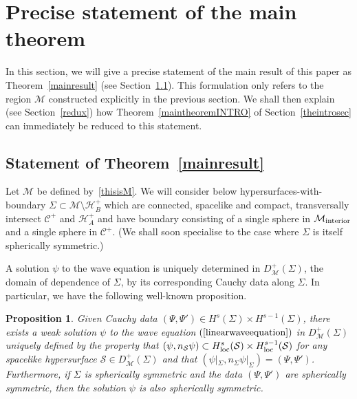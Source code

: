 \documentclass[A4,10pt]{article}
\newtheorem{proposition}{Proposition}[subsection]
\begin{document}
\section{Precise statement of the main theorem}\label{resultsection}





In this section, we will give a precise statement of the main result of this paper as Theorem~\ref{mainresult}
(see Section~\ref{mainresultsubse}).
This formulation only refers to the region $\mathcal{M}$ constructed explicitly
in the previous section. We shall then explain (see Section~\ref{redux})
how Theorem~\ref{maintheoremINTRO} of Section~\ref{theintrosec} can immediately
be reduced to this statement.

\subsection{Statement of Theorem~\ref{mainresult}}
\label{mainresultsubse}

Let $\mathcal{M}$ be defined by~\eqref{thisisM}.
We will consider below hypersurfaces-with-boundary $\Sigma \subset \mathcal{M}\setminus \mathcal{H}^+_B$ 
which are
connected, spacelike and compact, 
 transversally intersect $\mathcal{C}^+$ and $\mathcal{H}^+_A$ and have
boundary consisting of a single sphere in $\mathcal{M}_{{\rm interior}}$ and a single sphere in $\mathcal{C}^+$. (We shall soon specialise to the case where $\Sigma$ is itself
spherically symmetric.)


A solution $\psi$ to the wave equation is uniquely determined in $D^+_{\mathcal{M}}\left(\Sigma\right)$, the domain of dependence of $\Sigma$, by its corresponding Cauchy data along $\Sigma$. In particular, we have the following well-known proposition.

\begin{proposition}\label{local}
Given Cauchy data $\left(\Psi,\Psi'\right) \in H^s(\Sigma) \times H^{s-1}(\Sigma)$, there exists a weak solution $\psi$ to the wave equation
$(\ref{linearwaveequation})$
 in $D^+_{\mathcal{M}}(\Sigma)$ uniquely defined by the property that $\left(\psi,n_{\mathcal{S}}\psi\right) \subset
H^s_{{\rm loc}}(\mathcal{S})\times H^{s-1}_{{\rm loc}}(\mathcal{S})$ for any 
spacelike hypersurface $\mathcal{S} \in D^+_{\mathcal{M}}(\Sigma)$ and that $(\psi|_{\Sigma},n_{\Sigma}\psi|_{\Sigma}) = (\Psi,\Psi')$. Furthermore, if $\Sigma$ is spherically symmetric
and the data $(\Psi,\Psi')$ are spherically symmetric, then the solution
$\psi$ is also spherically symmetric.
 \end{proposition}
\end{document}
